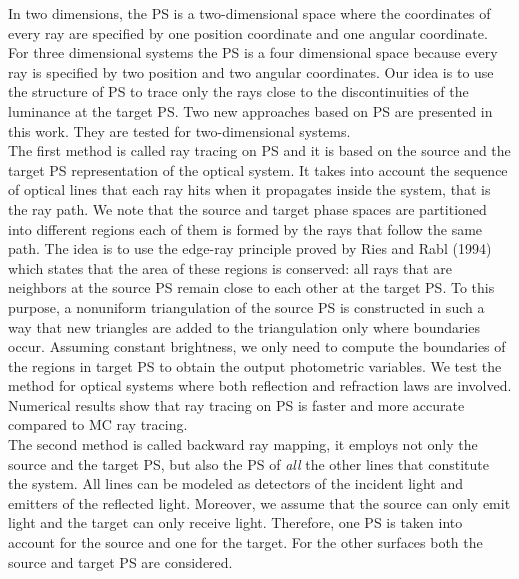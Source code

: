 In two dimensions, the PS is a two-dimensional space where the coordinates of every ray are specified by one position coordinate and one angular coordinate. 
For three dimensional systems the PS is a four dimensional space because every ray is specified by two position and two angular coordinates. Our idea is to use the structure of PS to trace only the rays close to the discontinuities of the luminance at the target PS.
Two new approaches based on PS are presented in this work. They are tested for two-dimensional systems. 
\\ \indent The first method is called ray tracing on PS and it is based on the source and the target PS representation of the optical system. It takes into account the sequence of optical lines that each ray hits when it propagates inside the system, that is the ray path. We note that the source and target phase spaces are partitioned into different regions each of them is formed by the rays that follow the same path. The idea is to use the edge-ray principle proved by Ries and Rabl (1994) which states that the area of these regions is conserved: all rays that are neighbors at the source PS remain close to each other at the target PS. To this purpose, a nonuniform triangulation of the source PS is constructed in such a way that new triangles are added to the triangulation only where boundaries occur. 
Assuming constant brightness, we only need to compute the boundaries of the regions in target PS to obtain the output photometric variables. 
We test the method for optical systems where both reflection and refraction laws are involved.
 Numerical results show that ray tracing on PS is faster and more accurate compared to MC ray tracing.
\\ \indent The second method is called backward ray mapping, it employs not only the source and the target PS, but also the PS of \textit{all} the other lines that constitute the system.
All lines can be modeled as detectors of the incident light and emitters of the reflected light.
Moreover, we assume that the source can only emit light and the target can only receive light.
Therefore, one PS is taken into account for the source and one for the target. For the other surfaces both the source and target PS are considered.
